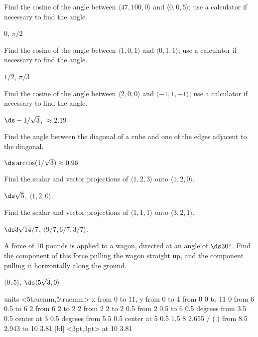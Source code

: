 \begin{theorem}
\begin{exercises}
\exercise Find the cosine of the angle between $\langle 47,100,0\rangle$
and $\langle 0,0,5\rangle$; use a calculator if necessary to find the angle.
\begin{answer} $0$, $\pi/2$
\end{answer}

\exercise Find the cosine of the angle between $\langle 1,0,1 \rangle$
and $\langle 0,1,1\rangle$; use a calculator if necessary to find the angle.
\begin{answer} $1/2$, $\pi/3$
\end{answer}

\exercise Find the cosine of the angle between $\langle 2,0,0\rangle$
and $\langle -1,1,-1\rangle$; use a calculator if necessary to find the angle.
\begin{answer} $\ds -1/\sqrt3$, $\approx 2.19$
\end{answer}

\exercise Find the angle between the diagonal of a cube and one of the
edges adjacent to the diagonal.
\begin{answer} $\ds \arccos(1/\sqrt3)\approx 0.96$
\end{answer}

\exercise Find the scalar and vector projections of $\langle 1,2,3\rangle$
onto $\langle 1,2,0\rangle$.
\begin{answer} $\ds \sqrt{5}$, $\langle 1,2,0\rangle$.
\end{answer}

\exercise Find the scalar and vector projections of $\langle 1,1,1\rangle$
onto $\langle 3,2,1\rangle$.
\begin{answer} $\ds 3\sqrt{14}/7$, $\langle 9/7,6/7,3/7\rangle$.
\end{answer}

\exercise A force of 10 pounds is applied to a wagon, directed at an
angle of $\ds 30^\circ$. Find the component of this force pulling the
wagon straight up, and the component pulling it horizontally along
the ground.
\begin{answer} $\langle 0,5\rangle$, $\ds \langle 5\sqrt3,0\rangle$
\end{answer}

\figure
\vbox{\beginpicture
\normalgraphs
\ninepoint
\setcoordinatesystem units <5truemm,5truemm>
\setplotarea x from 0 to 11, y from 0 to 4
\putrule from 0 0 to 11 0
\putrule from 6 0.5 to 6 2
\putrule from 6 2 to 2 2
\putrule from 2 2 to 2 0.5
\putrule from 2 0.5 to 6 0.5
 degrees from 3.5 0.5 center at 3 0.5
 degrees from 5.5 0.5 center at 5 0.5
 1.5 8 2.655 /
\setplotsymbol ({\twelvepoint.})
\arrow <4pt> [0.35, 1] from 8.5 2.943 to 10 3.81
 [bl] <3pt,3pt> at 10 3.81
\endpicture}


\end{exercises}
\end{theorem}
